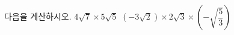다음을 계산하시오.
 $4\sqrt{7}\times 5\sqrt{5}$
 $(-3\sqrt{2})\times 2\sqrt{3}\times\left(-\sqrt{\dfrac{5}{3}}\right)$
